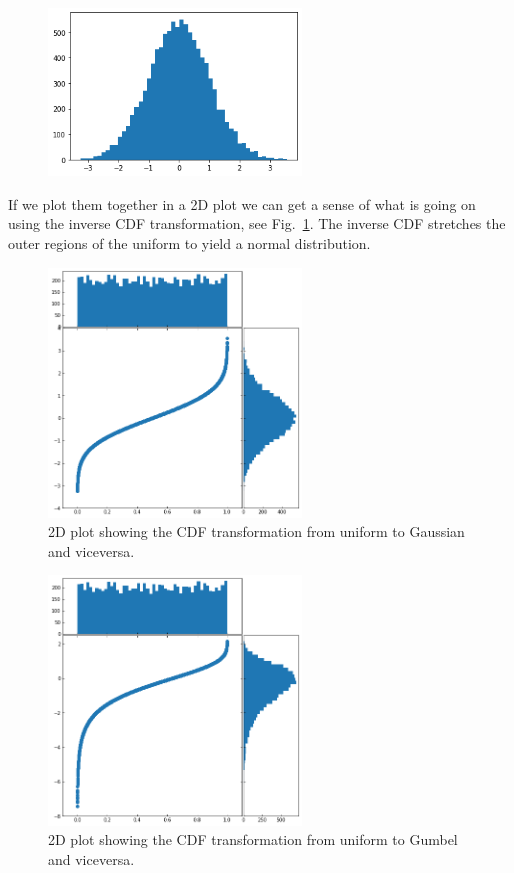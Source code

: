     \begin{figure}[h]
    \centering
    \includegraphics[width=0.6\textwidth]{copula_files/copula_3_0.png}
    \end{figure}
    
If we plot them together in a 2D plot we can get a sense of what is
going on using the inverse CDF transformation, see Fig.~\ref{fig:cdf_transform}.
The inverse CDF stretches the outer regions of the uniform to yield a
normal distribution.

    \begin{figure}[h]
\centering
    \includegraphics[width=0.6\textwidth]{copula_files/copula_5_0.png}
    \caption{2D plot showing the CDF transformation from uniform to Gaussian and viceversa.}
    \label{fig:cdf_transform}
    \end{figure}

    \begin{figure}[htbp]
\centering
\includegraphics[width=0.6\textwidth]{copula_files/copula_7_0.png}
\caption{2D plot showing the CDF transformation from uniform to Gumbel and viceversa.}
\label{fig:2d_gumbel}
    \end{figure}

